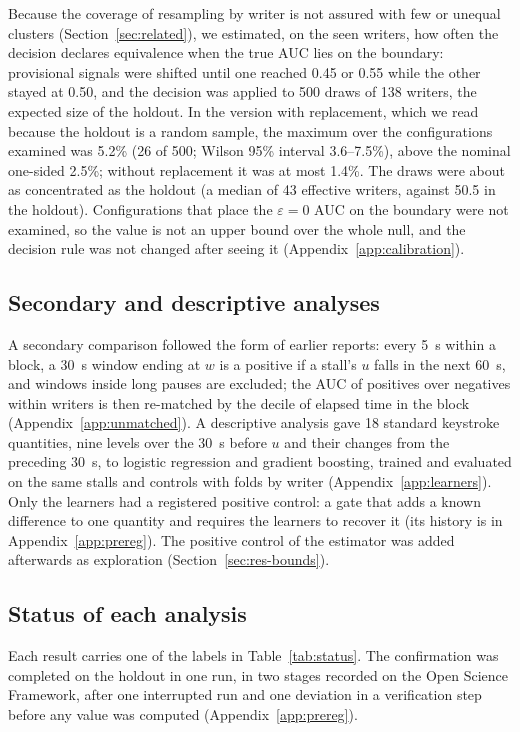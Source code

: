 Because the coverage of resampling by writer is not assured with few or unequal clusters (Section~\ref{sec:related}),
we estimated, on the seen writers, how often the decision declares equivalence when the true AUC lies on the boundary:
provisional signals were shifted until one reached 0.45 or 0.55 while the other stayed at 0.50, and the decision was
applied to 500 draws of 138 writers, the expected size of the holdout. In the version with replacement, which we read
because the holdout is a random sample, the maximum over the configurations examined was 5.2\% (26 of 500; Wilson 95\%
interval 3.6--7.5\%), above the nominal one-sided 2.5\%; without replacement it was at most 1.4\%. The draws were about as
concentrated as the holdout (a median of 43 effective writers, against 50.5 in the holdout). Configurations that place
the $\varepsilon = 0$ AUC on the boundary were not examined, so the value is not an upper bound over the whole null, and
the decision rule was not changed after seeing it (Appendix~\ref{app:calibration}).

\subsection{Secondary and descriptive analyses}

A secondary comparison followed the form of earlier reports: every 5~s within a block, a 30~s window ending at $w$ is a
positive if a stall's $u$ falls in the next 60~s, and windows inside long pauses are excluded; the AUC of positives over
negatives within writers is then re-matched by the decile of elapsed time in the block (Appendix~\ref{app:unmatched}).
A descriptive analysis gave 18 standard keystroke quantities, nine levels over the 30~s before $u$ and their changes from
the preceding 30~s, to logistic regression and gradient boosting, trained and evaluated on the same stalls and controls
with folds by writer (Appendix~\ref{app:learners}). Only the learners had a registered positive control: a gate that adds a known difference to one quantity and requires
the learners to recover it (its history is in Appendix~\ref{app:prereg}). The positive control of the estimator was
added afterwards as exploration (Section~\ref{sec:res-bounds}).

\subsection{Status of each analysis}

Each result carries one of the labels in Table~\ref{tab:status}. The confirmation was completed on the holdout in one run, in two
stages recorded on the Open Science Framework, after one interrupted run and one deviation in a verification step
before any value was computed (Appendix~\ref{app:prereg}).

